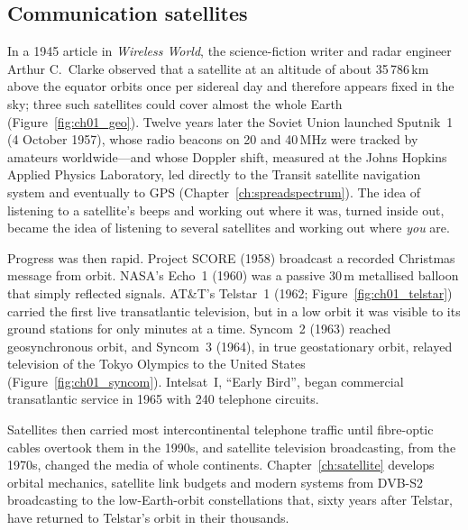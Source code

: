 \subsection{Communication satellites}

In a 1945 article in \emph{Wireless World}, the science-fiction writer and radar engineer Arthur
C.~Clarke observed that a satellite at an altitude of about 35\,786\,km above the equator orbits once
per sidereal day and therefore appears fixed in the sky; three such satellites could cover almost the
whole Earth (Figure~\ref{fig:ch01_geo}). Twelve years later the Soviet Union launched Sputnik~1
(4 October 1957), whose radio beacons on 20 and 40\,MHz were tracked by amateurs worldwide---and whose
Doppler shift, measured at the Johns Hopkins Applied Physics Laboratory, led directly to the Transit
satellite navigation system and eventually to GPS (Chapter~\ref{ch:spreadspectrum}). The idea of
listening to a satellite's beeps and working out where it was, turned inside out, became the idea of
listening to several satellites and working out where \emph{you} are.

Progress was then rapid. Project SCORE (1958) broadcast a recorded Christmas message from orbit.
NASA's Echo~1 (1960) was a passive 30\,m metallised balloon that simply reflected signals. AT\&T's
Telstar~1 (1962; Figure~\ref{fig:ch01_telstar}) carried the first live transatlantic television, but in
a low orbit it was visible to its ground stations for only minutes at a time. Syncom~2 (1963) reached
geosynchronous orbit, and Syncom~3 (1964), in true geostationary orbit, relayed television of the Tokyo
Olympics to the United States (Figure~\ref{fig:ch01_syncom}). Intelsat~I, ``Early Bird'', began
commercial transatlantic service in 1965 with 240 telephone circuits.


Satellites then carried most intercontinental telephone traffic until fibre-optic cables overtook them
in the 1990s, and satellite television broadcasting, from the 1970s, changed the media of whole
continents. Chapter~\ref{ch:satellite} develops orbital mechanics, satellite link budgets and modern
systems from DVB-S2 broadcasting to the low-Earth-orbit constellations that, sixty years after
Telstar, have returned to Telstar's orbit in their thousands.

